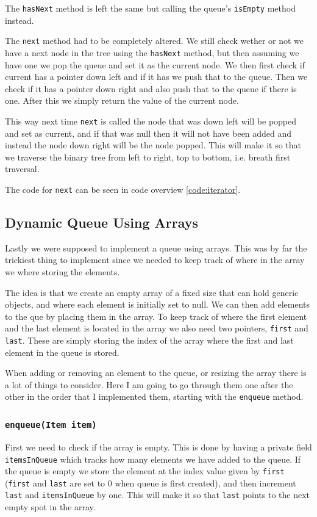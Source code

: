 \documentclass[a4paper,11pt]{article}
\begin{document}
The {\tt hasNext} method is left the same but calling the queue's {\tt isEmpty} method instead.

The {\tt next} method had to be completely altered. We still check wether or not we have a next node in the tree using the {\tt hasNext} method, but
then assuming we have one we pop the queue and set it as the current node. We then first check if current has a pointer down left and if it has we push that to
the queue. Then we check if it has a pointer down right and also push that to the queue if there is one. After this we simply return the value of the current node.

This way next time {\tt next} is called the node that was down left will be popped and set as current, and if that was null then it will not have been added and
instead the node down right will be the node popped. This will make it so that we traverse the binary tree from left to right, top to bottom, i.e. breath first
traversal.

The code for {\tt next} can be seen in code overview \ref{code:iterator}.
\subsection{Dynamic Queue Using Arrays}
Lastly we were supposed to implement a queue using arrays. This was by far the trickiest thing to implement since
we needed to keep track of where in the array we where storing the elements.

The idea is that we create an empty array of a fixed size that can hold generic objects, and where each element is
initially set to null. We can then add elements to the que by placing them in the array. To keep track of where the first
element and the last element is located in the array we also need two pointers, {\tt first} and {\tt last}. These are
simply storing the index of the array where the first and last element in the queue is stored.

When adding or removing an element to the queue, or resizing the array there is a lot of things to consider.
Here I am going to go through them one after
the other in the order that I implemented them, starting with the {\tt enqueue} method.

\subsubsection{{\tt enqueue(Item item)}}
First we need to check if the array is empty. This is done by having a private field {\tt itemsInQueue} which tracks
how many elements we have added to the queue. If the queue is empty we store the element at the index value given
by {\tt first} ({\tt first} and {\tt last} are set to 0 when queue is first created), and then increment {\tt last}
and {\tt itemsInQueue} by one. This will make it so that {\tt last} points to the next empty spot in the array.
\end{document}
